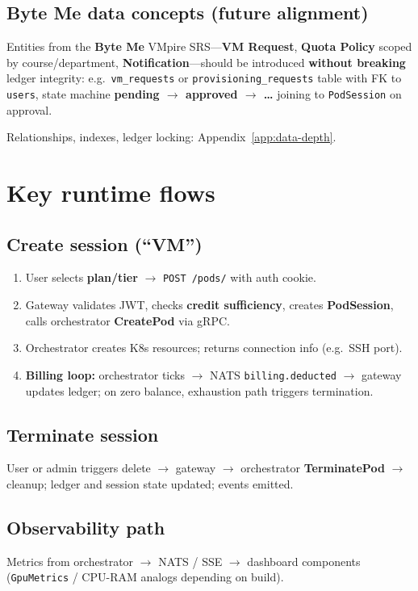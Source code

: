 \documentclass[12pt,a4paper]{article}
\newcommand{\ByteMeHeading}{Byte Me}
\newcommand{\ByteMe}{%
  \texorpdfstring{\textbf{\ByteMeHeading}}{Byte Me}%
}
\begin{document}
\subsection{\ByteMe{} data concepts (future alignment)}
Entities from the \ByteMe{} VMpire SRS---\textbf{VM Request}, \textbf{Quota Policy} scoped by course/department, \textbf{Notification}---should be introduced \textbf{without breaking} ledger integrity: e.g.\ \texttt{vm\_requests} or \texttt{provisioning\_requests} table with FK to \texttt{users}, state machine \textbf{pending $\rightarrow$ approved $\rightarrow$ \ldots} joining to \texttt{PodSession} on approval.

Relationships, indexes, ledger locking: Appendix~\ref{app:data-depth}.

\section{Key runtime flows}
\label{sec:flows}

\subsection{Create session (``VM'')}
\begin{enumerate}[leftmargin=*]
  \item User selects \textbf{plan/tier} $\rightarrow$ \texttt{POST /pods/} with auth cookie.
  \item Gateway validates JWT, checks \textbf{credit sufficiency}, creates \textbf{PodSession}, calls orchestrator \textbf{CreatePod} via gRPC.
  \item Orchestrator creates K8s resources; returns connection info (e.g.\ SSH port).
  \item \textbf{Billing loop:} orchestrator ticks $\rightarrow$ NATS \texttt{billing.deducted} $\rightarrow$ gateway updates ledger; on zero balance, exhaustion path triggers termination.
\end{enumerate}

\subsection{Terminate session}
User or admin triggers delete $\rightarrow$ gateway $\rightarrow$ orchestrator \textbf{TerminatePod} $\rightarrow$ cleanup; ledger and session state updated; events emitted.

\subsection{Observability path}
Metrics from orchestrator $\rightarrow$ NATS / SSE $\rightarrow$ dashboard components (\texttt{GpuMetrics} / CPU-RAM analogs depending on build).
\end{document}

